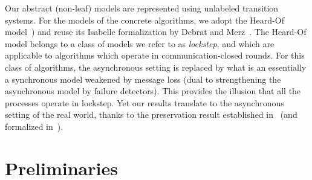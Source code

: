 \documentclass[12pt]{article}
\begin{document}
Our abstract (non-leaf) models are represented using unlabeled
transition systems. For the models of the concrete algorithms, we
adopt the Heard-Of model~\cite{charron-bost_heard-model:_2009}) and
reuse its Isabelle formalization by Debrat and
Merz~\cite{DBLP:journals/afp/DebratM12}. The Heard-Of model belongs to
a class of models we refer to as \emph{lockstep}, and which are
applicable to algorithms which operate in communication-closed
rounds. For this class of algorithms, the asynchronous setting is
replaced by what is an essentially a synchronous model weakened by
message loss (dual to strengthening the asynchronous model by failure
detectors). This provides the illusion that all the processes operate
in lockstep. Yet our results translate to the asynchronous setting of
the real world, thanks to the preservation result established
in~\cite{chaouch-saad_reduction_2009} (and formalized
in~\cite{DBLP:journals/afp/DebratM12}).

\section{Preliminaries}
\label{sec:introduction}

  



\end{document}
